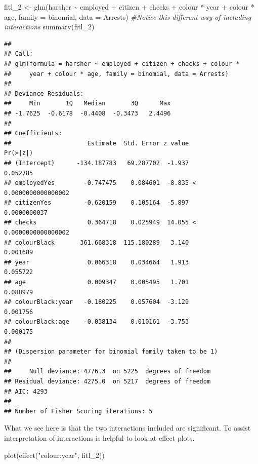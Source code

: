 \documentclass[
]{book}
\newenvironment{Shaded}{\begin{snugshade}}{\end{snugshade}}
\newcommand{\AttributeTok}[1]{\textcolor[rgb]{0.77,0.63,0.00}{#1}}
\newcommand{\CommentTok}[1]{\textcolor[rgb]{0.56,0.35,0.01}{\textit{#1}}}
\newcommand{\FunctionTok}[1]{\textcolor[rgb]{0.00,0.00,0.00}{#1}}
\newcommand{\NormalTok}[1]{#1}
\newcommand{\OtherTok}[1]{\textcolor[rgb]{0.56,0.35,0.01}{#1}}
\newcommand{\SpecialCharTok}[1]{\textcolor[rgb]{0.00,0.00,0.00}{#1}}
\newcommand{\StringTok}[1]{\textcolor[rgb]{0.31,0.60,0.02}{#1}}
\begin{document}
\begin{Shaded}
\begin{Highlighting}[]
\NormalTok{fitl\_2 }\OtherTok{\textless{}{-}} \FunctionTok{glm}\NormalTok{(harsher }\SpecialCharTok{\textasciitilde{}}\NormalTok{ employed }\SpecialCharTok{+}\NormalTok{ citizen }\SpecialCharTok{+}\NormalTok{ checks }\SpecialCharTok{+}\NormalTok{ colour }\SpecialCharTok{*}\NormalTok{ year }\SpecialCharTok{+}\NormalTok{ colour }\SpecialCharTok{*}\NormalTok{ age, }\AttributeTok{family =}\NormalTok{ binomial, }\AttributeTok{data =}\NormalTok{ Arrests) }\CommentTok{\#Notice this different way of including interactions}
\FunctionTok{summary}\NormalTok{(fitl\_2)}
\end{Highlighting}
\end{Shaded}

\begin{verbatim}
## 
## Call:
## glm(formula = harsher ~ employed + citizen + checks + colour * 
##     year + colour * age, family = binomial, data = Arrests)
## 
## Deviance Residuals: 
##     Min       1Q   Median       3Q      Max  
## -1.7625  -0.6178  -0.4408  -0.3473   2.4496  
## 
## Coefficients:
##                     Estimate  Std. Error z value             Pr(>|z|)
## (Intercept)      -134.187783   69.287702  -1.937             0.052785
## employedYes        -0.747475    0.084601  -8.835 < 0.0000000000000002
## citizenYes         -0.620159    0.105164  -5.897         0.0000000037
## checks              0.364718    0.025949  14.055 < 0.0000000000000002
## colourBlack       361.668318  115.180289   3.140             0.001689
## year                0.066318    0.034664   1.913             0.055722
## age                 0.009347    0.005495   1.701             0.088979
## colourBlack:year   -0.180225    0.057604  -3.129             0.001756
## colourBlack:age    -0.038134    0.010161  -3.753             0.000175
## 
## (Dispersion parameter for binomial family taken to be 1)
## 
##     Null deviance: 4776.3  on 5225  degrees of freedom
## Residual deviance: 4275.0  on 5217  degrees of freedom
## AIC: 4293
## 
## Number of Fisher Scoring iterations: 5
\end{verbatim}

What we see here is that the two interactions included are significant. To assist interpretation of interactions is helpful to look at effect plots.

\begin{Shaded}
\begin{Highlighting}[]
\FunctionTok{plot}\NormalTok{(}\FunctionTok{effect}\NormalTok{(}\StringTok{"colour:year"}\NormalTok{, fitl\_2))}
\end{Highlighting}
\end{Shaded}
\end{document}
